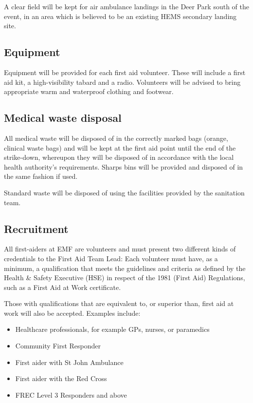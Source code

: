 A clear field will be kept for air ambulance landings in the Deer Park south of
the event, in an area which is believed to be an existing HEMS secondary landing
site.

\subsection{Equipment}
Equipment will be provided for each first aid volunteer. These will include a
first aid kit, a high-visibility tabard and a radio. Volunteers will be advised
to bring appropriate warm and waterproof clothing and footwear.

\subsection{Medical waste disposal}
All medical waste will be disposed of in the correctly marked bags (orange,
clinical waste bags) and will be kept at the first aid point until the end of
the strike-down, whereupon they will be disposed of in accordance with the
local health authority's requirements. Sharps bins will be provided and
disposed of in the same fashion if used.

Standard waste will be disposed of using the facilities provided by the sanitation team.

\subsection{Recruitment}
All first-aiders at EMF are volunteers and must present two different kinds of
credentials to the First Aid Team Lead: Each volunteer must have, as a minimum,
a qualification that meets the guidelines and criteria as defined by the Health
\& Safety Executive (HSE) in respect of the 1981 (First Aid) Regulations, such
as a First Aid at Work certificate.

Those with qualifications that are equivalent to, or superior than,
first aid at work will also be accepted. Examples include:

\begin{itemize}
 \tightlist
  \item Healthcare professionals, for example GPs, nurses, or paramedics
  \item Community First Responder
  \item First aider with St John Ambulance
  \item First aider with the Red Cross
  \item FREC Level 3 Responders and above
\end{itemize}

